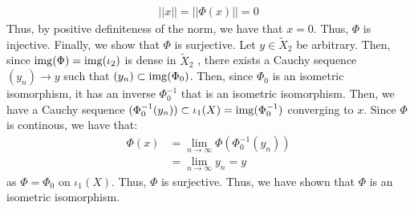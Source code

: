 \documentclass[12pt]{article}
\begin{document}
\begin{solution}
    \begin{align*}
        ||x|| = ||\Phi(x)|| = 0
    \end{align*}
    Thus, by positive definiteness of the norm, we have that $x = 0$. Thus, $\Phi$ is injective. \bbni
    Finally, we show that $\Phi$ is surjective. Let $y \in \tilde{X}_2$ be arbitrary. Then, since $\operatorname{img}(\Phi) = \operatorname{img}(\iota_2)$ is dense in $\tilde{X}_2$ , there exists a Cauchy sequence $(y_n) \to y$ such that $(y_n) \subset \operatorname{img}(\Phi_0)$. Then, since $\Phi_0$ is an isometric isomorphism, it has an inverse $\Phi_0^{-1}$ that is an isometric isomorphism. Then, we have a Cauchy sequence $(\Phi_0^{-1}(y_n)) \subset \iota_1(X) = \operatorname{img}(\Phi_0^{-1})$ converging to $x$. Since $\Phi$ is continous, we have that:
    \begin{align*}
        \Phi(x) &= \lim_{n \to \infty} \Phi(\Phi_0^{-1}(y_n)) \\
        &= \lim_{n \to \infty} y_n = y
    \end{align*}
    as $\Phi = \Phi_0$ on $\iota_1(X)$. Thus, $\Phi$ is surjective. \bbni
    Thus, we have shown that $\Phi$ is an isometric isomorphism. \bbni
\end{solution}
\newpage 
\end{document}
